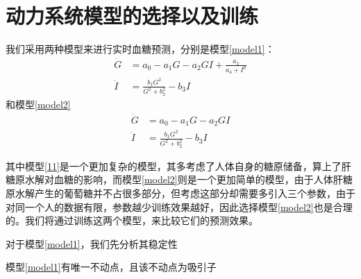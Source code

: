 \section{动力系统模型的选择以及训练}
我们采用两种模型来进行实时血糖预测，分别是模型\ref{model1}：
\begin{equation}\label{model1}
    \begin{aligned}
        \dot{G} & = a_0-a_1G-a_2GI+\frac{a_3}{a_4+I^p}  \\
        \dot{I} & = \frac{b_1 G^2}{G^2 + b_2^2} - b_3 I
    \end{aligned}
\end{equation}
和模型\ref{model2}
\begin{equation}\label{model2}
    \begin{aligned}
        \dot{G} & = a_0-a_1G-a_2GI  \\
        \dot{I} & = \frac{b_1 G^2}{G^2 + b_2^2} - b_3 I
    \end{aligned}
\end{equation}

其中模型\ref{11}是一个更加复杂的模型，其多考虑了人体自身的糖原储备，算上了肝糖原水解对血糖的影响，而模型\ref{model2}则是一个更加简单的模型，由于人体肝糖原水解产生的葡萄糖并不占很多部分，但考虑这部分却需要多引入三个参数，由于对同一个人的数据有限，参数越少训练效果越好，因此选择模型\ref{model2}也是合理的。我们将通过训练这两个模型，来比较它们的预测效果。

对于模型\ref{model1}，我们先分析其稳定性
\begin{prop}
    模型\ref{model1}有唯一不动点，且该不动点为吸引子
\end{prop}

